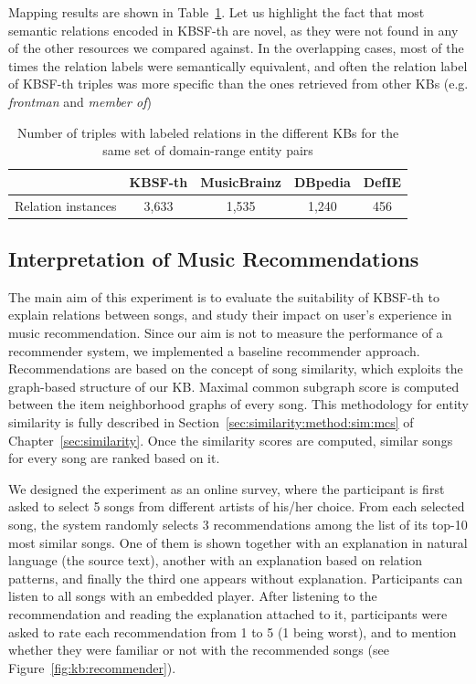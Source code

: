 Mapping results are shown in Table~\ref{tbl:kb:coverage}. Let us highlight the fact that most semantic relations encoded in \textsc{KBSF}-th are novel, as they were not found in any of the other resources we compared against. In the overlapping cases, most of the times the relation labels were semantically equivalent, and often the relation label of \textsc{KBSF}-th triples was more specific than the ones retrieved from other \textsc{KB}s (e.g. \textit{frontman} and \textit{member of})

\begin{table}[ht!]
\scriptsize
\centering
	\begin{tabular}{ | c | c | c | c | c |}
	\hline
	& KBSF-th & MusicBrainz & DBpedia & DefIE \\
	\hline
	Relation instances & 3,633 & 1,535 & 1,240 & 456 \\
	\hline
	\end{tabular}
	\caption{Number of triples with labeled relations in the different KBs for the same set of domain-range entity pairs}
	\label{tbl:kb:coverage}
\end{table}


\subsection{Interpretation of Music Recommendations}
\label{sec:kb:experiments:recommendation}

The main aim of this experiment is to evaluate the suitability of \textsc{KBSF}-th to explain relations between songs, and study their impact on user's experience in music recommendation. 
Since our aim is not to measure the performance of a recommender system, we implemented a baseline recommender approach. Recommendations are based on the concept of song similarity, which exploits the graph-based structure of our \textsc{KB}. Maximal common subgraph score is computed between the item neighborhood graphs of every song. This methodology for entity similarity is fully described in Section~\ref{sec:similarity:method:sim:mcs} of Chapter~\ref{sec:similarity}. Once the similarity scores are computed, similar songs for every song are ranked based on it.


We designed the experiment as an online survey, where the participant is first asked to select 5 songs from different artists of his/her choice. From each selected song, the system randomly selects 3 recommendations among the list of its top-10 most similar songs. One of them is shown together with an explanation in natural language (the source text), another with an explanation based on relation patterns, and finally the third one appears without explanation.
Participants can listen to all songs with an embedded player. After listening to the recommendation and reading the explanation attached to it, participants were asked to rate each recommendation from 1 to 5 (1 being worst), and to mention whether they were familiar or not with the recommended songs (see Figure~\ref{fig:kb:recommender}).


